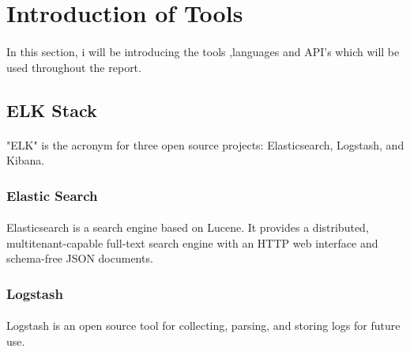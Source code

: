 \documentclass{article}
\begin{document}
 
\thispagestyle{empty}
 
\tableofcontents
 
\listoffigures
 
\listoftables

\lstlistoflistings

\newpage
 

\section{Introduction of Tools}

\paragraph{}
In this section, i will be introducing the tools ,languages and API's which will be used throughout the report.

\subsection{ELK Stack}
\paragraph{}
"ELK" is the acronym for three open source projects: Elasticsearch, Logstash, and Kibana.

\subsubsection{Elastic Search}

\paragraph{}
Elasticsearch is a search engine based on Lucene. It provides a distributed, multitenant-capable full-text search engine with an HTTP web interface and schema-free JSON documents.

\subsubsection{Logstash}

\paragraph{}
Logstash is an open source tool for collecting, parsing, and storing logs for future use.
\end{document}
